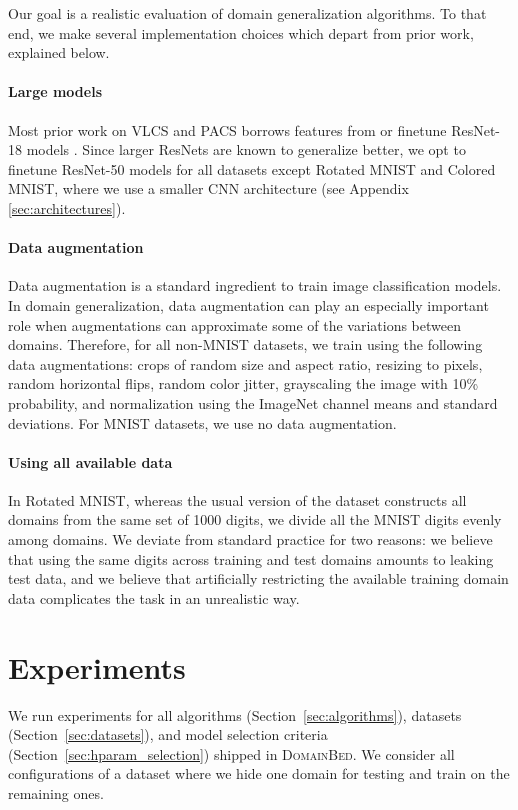 \documentclass{article}
\newcommand{\domainbed}{\textsc{DomainBed}\xspace}
\begin{document}
Our goal is a realistic evaluation of domain generalization algorithms.
To that end, we make several implementation choices which depart from prior work, explained below.

\paragraph{Large models}
Most prior work on VLCS and PACS borrows features from or finetune ResNet-18 models \citep{He_2016_CVPR}.
Since larger ResNets are known to generalize better, we opt to finetune ResNet-50 models for all datasets except Rotated MNIST and Colored MNIST, where we use a smaller CNN architecture (see Appendix \ref{sec:architectures}).

\paragraph{Data augmentation}
Data augmentation is a standard ingredient to train image classification models.
In domain generalization, data augmentation can play an especially important role when augmentations can approximate some of the variations between domains.
Therefore, for all non-MNIST datasets, we train using the following data augmentations:
crops of random size and aspect ratio, resizing to  pixels, random horizontal flips, random color jitter, grayscaling the image with 10\% probability, and normalization using the ImageNet channel means and standard deviations.
For MNIST datasets, we use no data augmentation.

\paragraph{Using all available data}
In Rotated MNIST, whereas the usual version of the dataset constructs all domains from the same set of 1000 digits, we divide all the MNIST digits evenly among domains.
We deviate from standard practice for two reasons: we believe that using the same digits across training and test domains amounts to leaking test data, and we believe that artificially restricting the available training domain data complicates the task in an unrealistic way.

\section{Experiments}
\label{sec:experiments}

We run experiments for all algorithms (Section~\ref{sec:algorithms}), datasets (Section~\ref{sec:datasets}), and model selection criteria (Section~\ref{sec:hparam_selection}) shipped in \domainbed.
We consider all configurations of a dataset where we hide one domain for testing and train on the remaining ones.
\end{document}
